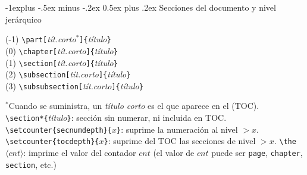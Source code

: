 \documentclass[10pt,landscape,a4paper]{article}
\makeatletter
\renewcommand{\section}{\@startsection{section}{1}{0mm}%
                                {-1ex plus -.5ex minus -.2ex}%
                                {0.5ex plus .2ex}%
                                {\normalfont\large\bfseries}}
\renewcommand{\subsection}{\@startsection{subsection}{2}{0mm}%
                                {-1explus -.5ex minus -.2ex}%
                                {0.5ex plus .2ex}%
                                {\normalfont\normalsize\bfseries}}
\renewcommand{\subsubsection}{\@startsection{subsubsection}{3}{0mm}%
                                {-1ex plus -.5ex minus -.2ex}%
                                {1ex plus .2ex}%
                                {\normalfont\small\bfseries}}
\makeatother
\begin{document}
\begin{multicols}{3}
\subsection{Secciones del documento y nivel jerárquico}
\begin{multicols}{2}
(-1) \verb!\part[!\emph{tít.corto$^*$}\verb!]{!\emph{título}\verb!}!  \\
(0) \verb!\chapter[!\emph{tít.corto}\verb!]{!\emph{título}\verb!}!  \\
(1) \verb!\section[!\emph{tít.corto}\verb!]{!\emph{título}\verb!}!  \\
(2) \verb!\subsection[!\emph{tít.corto}\verb!]{!\emph{título}\verb!}!  \\
(3) \verb!\subsubsection[!\emph{tít.corto}\verb!]{!\emph{título}\verb!}!  \\
\end{multicols}


$^*$Cuando se suministra, un \emph{título corto} es el que aparece en el (TOC).\\[0.7mm]
\verb!\section*{!\emph{título}\verb!}!: sección sin numerar, ni incluida en TOC.\\
\verb!\setcounter{secnumdepth}{!$x$\verb!}!: suprime la numeración al nivel $>x$.
\verb!\setcounter{tocdepth}{!$x$\verb!}!: suprime del TOC las secciones de nivel $>x$.
\verb!\the!$\langle cnt \rangle$: imprime el valor del contador $cnt$ (el valor de $cnt$ puede ser \texttt{page}, \texttt{chapter}, \texttt{section}, etc.)







\end{multicols}
\end{document}
